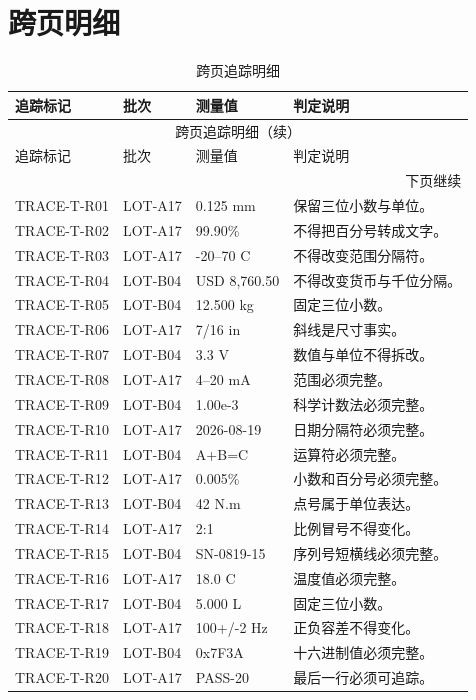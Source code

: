 \documentclass[10pt,a4paper]{ctexart}
\begin{document}
\section{跨页明细}
\begin{longtable}{p{28mm}p{28mm}p{30mm}p{55mm}}
\caption{跨页追踪明细}\label{tab:trace-long}\\
\toprule
追踪标记 & 批次 & 测量值 & 判定说明 \\
\midrule
\endfirsthead
\multicolumn{4}{c}{跨页追踪明细（续）}\\
\toprule
追踪标记 & 批次 & 测量值 & 判定说明 \\
\midrule
\endhead
\midrule
\multicolumn{4}{r}{下页继续}\\
\endfoot
\bottomrule
\endlastfoot
TRACE-T-R01 & LOT-A17 & 0.125 mm & 保留三位小数与单位。\\
TRACE-T-R02 & LOT-A17 & 99.90\% & 不得把百分号转成文字。\\
TRACE-T-R03 & LOT-A17 & -20--70 C & 不得改变范围分隔符。\\
TRACE-T-R04 & LOT-B04 & USD 8,760.50 & 不得改变货币与千位分隔。\\
TRACE-T-R05 & LOT-B04 & 12.500 kg & 固定三位小数。\\
TRACE-T-R06 & LOT-A17 & 7/16 in & 斜线是尺寸事实。\\
TRACE-T-R07 & LOT-B04 & 3.3 V & 数值与单位不得拆改。\\
TRACE-T-R08 & LOT-A17 & 4--20 mA & 范围必须完整。\\
TRACE-T-R09 & LOT-B04 & 1.00e-3 & 科学计数法必须完整。\\
TRACE-T-R10 & LOT-A17 & 2026-08-19 & 日期分隔符必须完整。\\
TRACE-T-R11 & LOT-B04 & A+B=C & 运算符必须完整。\\
TRACE-T-R12 & LOT-A17 & 0.005\% & 小数和百分号必须完整。\\
TRACE-T-R13 & LOT-B04 & 42 N.m & 点号属于单位表达。\\
TRACE-T-R14 & LOT-A17 & 2:1 & 比例冒号不得变化。\\
TRACE-T-R15 & LOT-B04 & SN-0819-15 & 序列号短横线必须完整。\\
TRACE-T-R16 & LOT-A17 & 18.0 C & 温度值必须完整。\\
TRACE-T-R17 & LOT-B04 & 5.000 L & 固定三位小数。\\
TRACE-T-R18 & LOT-A17 & 100+/-2 Hz & 正负容差不得变化。\\
TRACE-T-R19 & LOT-B04 & 0x7F3A & 十六进制值必须完整。\\
TRACE-T-R20 & LOT-A17 & PASS-20 & 最后一行必须可追踪。\\

\end{longtable}
\end{document}
